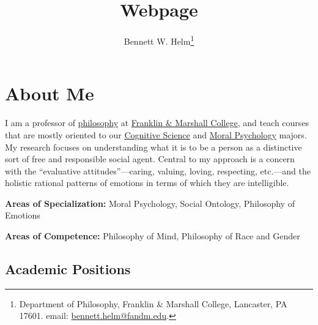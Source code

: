 \documentclass[%
  11pt,%
]{article}
\begin{document}

\ifx\HCode\undefined
  \title{Webpage}
  \author{Bennett W. Helm\footnote{Department of Philosophy, Franklin \& Marshall College, Lancaster, PA 17601. email: \href{mailto:bennett.helm@fandm.edu}{bennett.helm@fandm.edu}.}}
  \date{}
  \maketitle
\fi

\tableofcontents

\ifdefined\HCode

    \begin{center}
    \end{center}
\fi

\section*{About Me}

I am a professor of \href{https://www.fandm.edu/fields-of-study/philosophy/index.html}{philosophy} at \href{https://www.fandm.edu}{Franklin \& Marshall College}, and teach courses that are mostly oriented to our \href{https://www.fandm.edu/fields-of-study/cognitive-science/index.html}{Cognitive Science} and \href{https://www.fandm.edu/fields-of-study/moral-psychology/index.html}{Moral Psychology} majors. My research focuses on understanding what it is to be a person as a distinctive sort of free and responsible social agent. Central to my approach is a concern with the \enquote{evaluative attitudes}---caring, valuing, loving, respecting, etc.---and the holistic rational patterns of emotions in terms of which they are intelligible.

\noindent\textbf{Areas of Specialization:} Moral Psychology, Social Ontology, Philosophy of Emotions

\noindent\textbf{Areas of Competence:} Philosophy of Mind, Philosophy of Race and Gender

\subsection*{Academic Positions}
\end{document}
